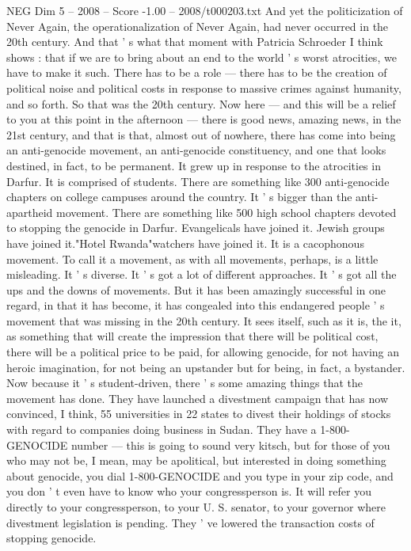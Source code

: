 \begin{textsample}{NEG Dim 5 – 2008 – Score -1.00 – 2008/t000203.txt}
And yet the politicization of Never Again, the operationalization of Never Again, had never occurred in the 20th century.
And that ' s what that moment with Patricia Schroeder I think shows : that if we are to bring about an end to the world ' s worst atrocities, we have to make it such.
There has to be a role — there has to be the creation of political noise and political costs in response to massive crimes against humanity, and so forth.
So that was the 20th century.
Now here — and this will be a relief to you at this point in the afternoon — there is good news, amazing news, in the 21st century, and that is that, almost out of nowhere, there has come into being an anti-genocide movement, an anti-genocide constituency, and one that looks destined, in fact, to be permanent.
It grew up in response to the atrocities in Darfur.
It is comprised of students.
There are something like 300 anti-genocide chapters on college campuses around the country.
It ' s bigger than the anti-apartheid movement.
There are something like 500 high school chapters devoted to stopping the genocide in Darfur.
Evangelicals have joined it.
Jewish groups have joined it."Hotel Rwanda"watchers have joined it.
It is a cacophonous movement.
To call it a movement, as with all movements, perhaps, is a little misleading.
It ' s diverse.
It ' s got a lot of different approaches.
It ' s got all the ups and the downs of movements.
But it has been amazingly successful in one regard, in that it has become, it has congealed into this endangered people ' s movement that was missing in the 20th century.
It sees itself, such as it is, the it, as something that will create the impression that there will be political cost, there will be a political price to be paid, for allowing genocide, for not having an heroic imagination, for not being an upstander but for being, in fact, a bystander.
Now because it ' s student-driven, there ' s some amazing things that the movement has done.
They have launched a divestment campaign that has now convinced, I think, 55 universities in 22 states to divest their holdings of stocks with regard to companies doing business in Sudan.
They have a 1-800-GENOCIDE number — this is going to sound very kitsch, but for those of you who may not be, I mean, may be apolitical, but interested in doing something about genocide, you dial 1-800-GENOCIDE and you type in your zip code, and you don ' t even have to know who your congressperson is.
It will refer you directly to your congressperson, to your U.
S. senator, to your governor where divestment legislation is pending.
They ' ve lowered the transaction costs of stopping genocide.

\end{textsample}
